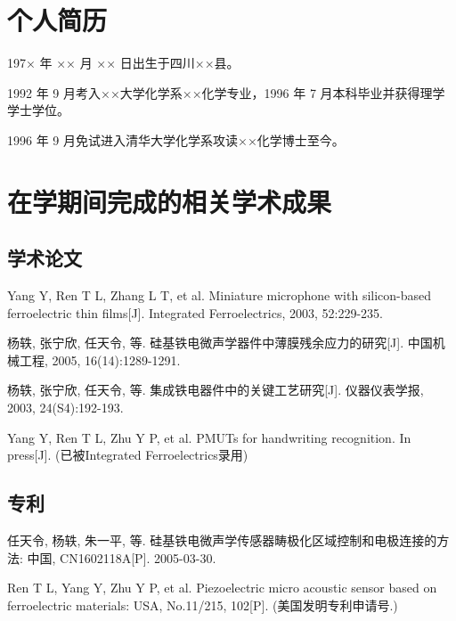
\begin{resume}
	
	\section*{个人简历}
	
	197× 年 ×× 月 ×× 日出生于四川××县。
	
	1992 年 9 月考入××大学化学系××化学专业，1996 年 7 月本科毕业并获得理学学士学位。
	
	1996 年 9 月免试进入清华大学化学系攻读××化学博士至今。
	
	
	\section*{在学期间完成的相关学术成果}
	
	\subsection*{学术论文}
	
	\begin{achievements}
		\item Yang Y, Ren T L, Zhang L T, et al. Miniature microphone with silicon-based ferroelectric thin films[J]. Integrated Ferroelectrics, 2003, 52:229-235.
		\item 杨轶, 张宁欣, 任天令, 等. 硅基铁电微声学器件中薄膜残余应力的研究[J]. 中国机械工程, 2005, 16(14):1289-1291.
		\item 杨轶, 张宁欣, 任天令, 等. 集成铁电器件中的关键工艺研究[J]. 仪器仪表学报, 2003, 24(S4):192-193.
		\item Yang Y, Ren T L, Zhu Y P, et al. PMUTs for handwriting recognition. In press[J]. (已被Integrated Ferroelectrics录用)
	\end{achievements}
	
	
	\subsection*{专利}
	
	\begin{achievements}
		\item 任天令, 杨轶, 朱一平, 等. 硅基铁电微声学传感器畴极化区域控制和电极连接的方法: 中国, CN1602118A[P]. 2005-03-30.
		\item Ren T L, Yang Y, Zhu Y P, et al. Piezoelectric micro acoustic sensor based on ferroelectric materials: USA, No.11/215, 102[P]. (美国发明专利申请号.)
	\end{achievements}
	
\end{resume}


